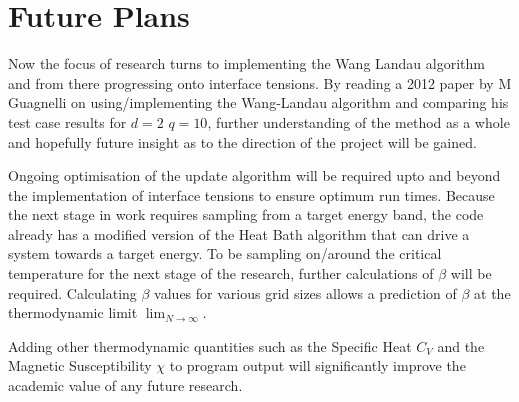\documentclass[10pt,a4paper]{article}
\begin{document}
\section{Future Plans}
Now the focus of research turns to implementing the Wang Landau algorithm and from there progressing onto interface tensions.
By reading a 2012 paper by M Guagnelli on using/implementing the Wang-Landau algorithm and comparing his test case results for $d=2$ $q=10$, further understanding of the method as a whole and hopefully future insight as to the direction of the project will be gained.

Ongoing optimisation of the update algorithm will be required upto and beyond the implementation of interface tensions to ensure optimum run times.  
Because the next stage in work requires sampling from a target energy band, the code already has a modified version of the Heat Bath algorithm that can drive a system towards a target energy.
To be sampling on/around the critical temperature for the next stage of the research, further calculations of $\beta$ will be required.
Calculating $\beta$ values for various grid sizes allows a prediction of $\beta$ at the thermodynamic limit $\lim_{N \to \infty}$.

Adding other thermodynamic quantities such as the Specific Heat $C_{V}$ and the Magnetic Susceptibility $\chi$ to program output will significantly improve the academic value of any future research.



\end{document}
